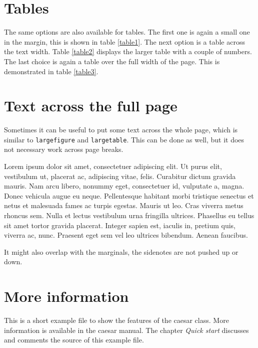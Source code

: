 \documentclass[]{caesar_book}
\begin{document}
\section{Tables}
The same options are also available for tables.%
%
%
The first one is again a small one in the margin, this is shown in table \ref{table1}. The next option is a table across the text width. %
%
%
Table \ref{table2} displays the larger table with a couple of numbers. The last choice is again a table over the full width of the page. This is demonstrated in table \ref{table3}.
%
%
%
\section{Text across the full page}
Sometimes it can be useful to put some text across the whole page, which is similar to \texttt{largefigure} and \texttt{largetable}. This can be done as well, but it does not necessary work across page breaks.

\begin{fullwidth}
Lorem ipsum dolor sit amet, consectetuer adipiscing elit. Ut purus elit, vestibulum ut, placerat ac, adipiscing vitae, felis. Curabitur dictum gravida mauris. Nam arcu libero, nonummy eget, consectetuer id, vulputate a, magna. Donec vehicula augue eu neque. Pellentesque habitant morbi tristique senectus et netus et malesuada fames ac turpis egestas. Mauris ut leo. Cras viverra metus rhoncus sem. Nulla et lectus vestibulum urna fringilla ultrices. Phasellus eu tellus sit amet tortor gravida placerat. Integer sapien est, iaculis in, pretium quis, viverra ac, nunc. Praesent eget sem vel leo ultrices bibendum. Aenean faucibus. 
\end{fullwidth}
%
It might also overlap with the marginals, the sidenotes are not pushed up or down.
%
\section{More information}
This is a short example file to show the features of the caesar class. More information is available in the caesar manual. The chapter \textit{Quick start} discusses and comments the source of this example file. 
%
\printbibliography[heading=bibintoc]
\end{document}
